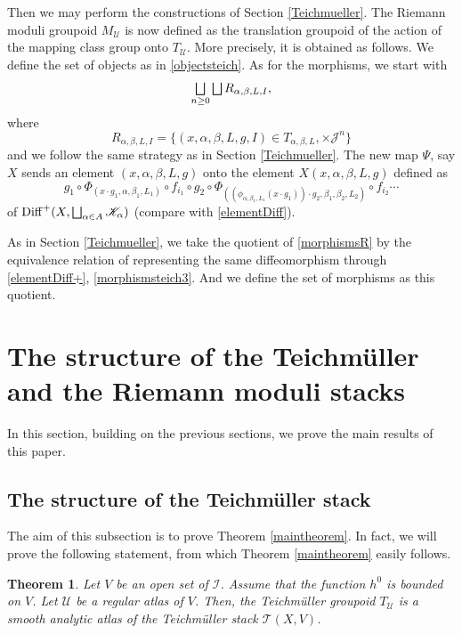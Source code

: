 \documentclass[10pt]{amsart}
\let\mathcal\mathscr
\let\oldbigsqcup\bigsqcup
\renewcommand{\bigsqcup}{\mathop{\textstyle\oldbigsqcup}\displaylimits}
\DeclareMathOperator{\Diff}{Diff}
\theoremstyle{plain}
\newtheorem{theorem}{Theorem}[section]
\theoremstyle{definition}
\theoremstyle{remark}
\numberwithin{equation}{section}
\newcommand{\DKp}{\Diff^+(X,\bigsqcup_{\alpha\in A}\mathcal K_\alpha)}
\newcommand{\cI}{\mathcal{I}}
\let\uniondisjointe\bigsqcup
\begin{document}
Then we may perform the constructions of Section \ref{Teichmueller}. The Riemann moduli groupoid $M_{\mathcal U}$ is now defined
as the translation groupoid of the action of the mapping class group onto $T_{\mathcal U}$. More precisely, it is obtained as follows. We define the set of objects
as in \eqref{objectsteich}. As for the morphisms, we start with
\begin{equation}
\label{morphismsR}
\uniondisjointe_{n\geq 0}\uniondisjointe R_{\alpha,\beta, L, I},
\end{equation}
where
\begin{equation}
\label{R}
R_{\alpha,\beta, L, I}=\{(x,\alpha,\beta,L,g,I)\in T_{\alpha,\beta, L},\times\mathcal J^n\}
\end{equation}
and we follow the same strategy as in Section \ref{Teichmueller}.
The new map $\Psi$, say $X$ sends an element $(x,\alpha,\beta,L,g)$ onto the element $X(x,\alpha,\beta,L,g)$ defined as
\begin{equation}
\label{elementDiff+}
g_1\circ \Phi_{(x\cdot g_1,\alpha,\beta_1, L_1)}\circ f_{i_1}\circ g_2\circ \Phi_{((\phi_{\alpha,\beta_1,L_1}(x\cdot g_1))\cdot g_2,\beta_1,\beta_2, L_2)}\circ f_{i_2}\cdots\end{equation}
of $\DKp$ (compare with \eqref{elementDiff}).

As in Section \ref{Teichmueller}, we take the quotient of \eqref{morphismsR} by the equivalence relation of representing the same diffeomorphism through \eqref{elementDiff+}, \cf \eqref{morphismsteich3}. And we define the set of morphisms as this quotient.

\section{The structure of the Teichmüller and the Riemann moduli stacks}
\label{main}
In this section, building on the previous sections, we prove the main results of this paper.

\subsection{The structure of the Teichmüller stack}
\label{mainTeich}
The aim of this subsection is to prove
Theorem \ref{maintheorem}. In fact, we will prove the following statement, from which Theorem \ref{maintheorem} easily follows.


\begin{theorem}
\label{maintheorembis}
Let $V$ be an open set of $\cI$. Assume that the function $h^0$ is bounded on $V$. Let $\mathcal U$ be a regular atlas of $V$. Then,
the Teichmüller groupoid $T_{\mathcal U}$ is a smooth analytic atlas of the Teichmüller stack $\mathcal T(X,V)$.
\end{theorem}
\end{document}
